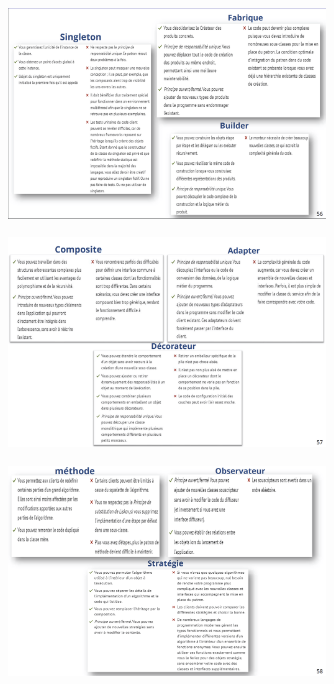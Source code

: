 \documentclass[16pt]{report}
\begin{document}
\begin{multicols*}{2}
\end{multicols*}

    \begin{figure}[H]
        \begin{center}
            \includegraphics[width=0.75\textwidth]{patcreav1.png}
        \end{center}
    \end{figure}



        
     \begin{figure}[H]
        \begin{center}
            \includegraphics[width=0.75\textwidth]{patcreav2.png}
        \end{center}
    \end{figure}
       


        
    \begin{figure}[H]
        \begin{center}
            \includegraphics[width=0.75\textwidth]{patcreav3.png}
        \end{center}
    \end{figure}
\end{document}

